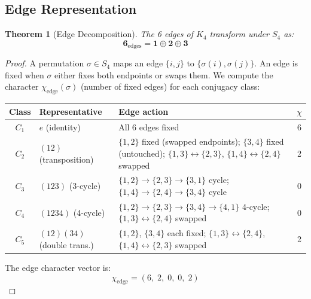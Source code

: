 \documentclass[11pt,a4paper]{article}
\newtheorem{theorem}{Theorem}[section]
\theoremstyle{definition}
\begin{document}
\subsection{Edge Representation}

\begin{theorem}[Edge Decomposition]
\label{S1:thm:edge_decomp}
The 6 edges of $K_4$ transform under $S_4$ as:
\begin{equation}
\mathbf{6}_{\mathrm{edges}} = \mathbf{1} \oplus \mathbf{2} \oplus \mathbf{3}
\label{S1:eq:edge_decomp}
\end{equation}
\end{theorem}

\begin{proof}
A permutation $\sigma \in S_4$ maps an edge $\{i,j\}$ to $\{\sigma(i), \sigma(j)\}$. An edge is fixed when $\sigma$ either fixes both endpoints or swaps them. We compute the character $\chi_{\mathrm{edge}}(\sigma)$ (number of fixed edges) for each conjugacy class:

\begin{center}
\renewcommand{\arraystretch}{1.25}
\begin{tabular}{clp{8.0cm}c}
\toprule
\textbf{Class} & \textbf{Representative} & \textbf{Edge action} & $\chi$ \\
\midrule
$C_1$ & $e$ (identity)
    & All 6 edges fixed & 6 \\
$C_2$ & $(12)$ (transposition)
    & $\{1,2\}$ fixed (swapped endpoints); $\{3,4\}$ fixed (untouched);\newline
      $\{1,3\}\!\leftrightarrow\!\{2,3\}$, $\{1,4\}\!\leftrightarrow\!\{2,4\}$ swapped & 2 \\
$C_3$ & $(123)$ (3-cycle)
    & $\{1,2\}\!\to\!\{2,3\}\!\to\!\{3,1\}$ cycle;\;
      $\{1,4\}\!\to\!\{2,4\}\!\to\!\{3,4\}$ cycle & 0 \\
$C_4$ & $(1234)$ (4-cycle)
    & $\{1,2\}\!\to\!\{2,3\}\!\to\!\{3,4\}\!\to\!\{4,1\}$ 4-cycle;\;
      $\{1,3\}\!\leftrightarrow\!\{2,4\}$ swapped & 0 \\
$C_5$ & $(12)(34)$ (double trans.)
    & $\{1,2\}$, $\{3,4\}$ each fixed;\;
      $\{1,3\}\!\leftrightarrow\!\{2,4\}$, $\{1,4\}\!\leftrightarrow\!\{2,3\}$ swapped & 2 \\
\bottomrule
\end{tabular}
\end{center}

The edge character vector is:
\begin{equation}
\chi_{\mathrm{edge}} = (6,\; 2,\; 0,\; 0,\; 2)
\end{equation}


\end{proof}
\end{document}
